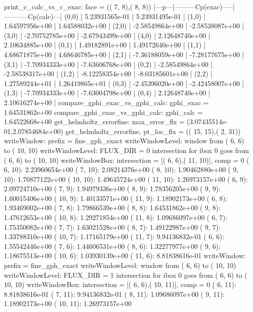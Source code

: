 \begin{itemize}
print_c_calc_vs_c_exac: face = ((  7,  8),(  8,  8))
|---p---|---------Cp(exac)-----|-----------Cp(calc)---|
(0,0)   |     5.23931565e-01   |     5.23931495e-01   |    
(1,0)   |     1.64597956e+00   |     1.64588032e+00   |    
(2,0)   |    -2.58549864e+00   |    -2.58538087e+00   |    
(3,0)   |    -2.70752785e+00   |    -2.67943499e+00   |    
(4,0)   |     2.12648740e+00   |     2.10634885e+00   |    
(0,1)   |     1.49182891e+00   |     1.49172640e+00   |    
(1,1)   |     4.68671875e+00   |     4.68646785e+00   |    
(2,1)   |    -7.36188059e+00   |    -7.28177675e+00   |    
(3,1)   |    -7.70934333e+00   |    -7.63606768e+00   |    
(0,2)   |    -2.58549864e+00   |    -2.58538317e+00   |    
(1,2)   |    -8.12258354e+00   |    -8.03185601e+00   |    
(2,2)   |     1.27589244e+01   |     1.26419865e+01   |    
(0,3)   |    -2.45396020e+00   |    -2.42458007e+00   |    
(1,3)   |    -7.70934333e+00   |    -7.63004798e+00   |    
(0,4)   |     2.12648740e+00   |     2.10616274e+00   |    
compare_gphi_exac_vs_gphi_calc: gphi_exac = 1.64531862e+00
compare_gphi_exac_vs_gphi_calc: gphi_calc = 1.64522668e+00
get_helmholtz_errorfine: max_error_flx = (3.07435514e-01,2.07854684e+00)
get_helmholtz_errorfine, pt_loc_flx    = (( 15, 15),(  2, 31))
writeWindow: prefix = fine_gph_exact     
writeWindowLevel:  window from (  6,  6) to ( 10, 10)
writeWindowLevel: FLUX_DIR = 0
 intersection for ibox  0 goes from (  6,  6) to ( 10, 10)
writeWindowBox: intersection = [(  6,  6),( 11, 10)], comp = 0
(  6, 10): 2.23960654e+00  (  7, 10): 2.08214376e+00  (  8, 10): 1.90462880e+00  (  9, 10): 1.70877122e+00  ( 10, 10): 1.49645724e+00  ( 11, 10): 1.26973157e+00  
(  6,  9): 2.09724710e+00  (  7,  9): 1.94979336e+00  (  8,  9): 1.78356205e+00  (  9,  9): 1.60015406e+00  ( 10,  9): 1.40133571e+00  ( 11,  9): 1.18902173e+00  
(  6,  8): 1.93469002e+00  (  7,  8): 1.79866539e+00  (  8,  8): 1.64531862e+00  (  9,  8): 1.47612653e+00  ( 10,  8): 1.29271854e+00  ( 11,  8): 1.09686097e+00  
(  6,  7): 1.75350082e+00  (  7,  7): 1.63021528e+00  (  8,  7): 1.49122987e+00  (  9,  7): 1.33788310e+00  ( 10,  7): 1.17165179e+00  ( 11,  7): 9.94136832e-01  
(  6,  6): 1.55542446e+00  (  7,  6): 1.44606531e+00  (  8,  6): 1.32277977e+00  (  9,  6): 1.18675513e+00  ( 10,  6): 1.03930139e+00  ( 11,  6): 8.81838616e-01  
writeWindow: prefix = fine_gph_exact     
writeWindowLevel:  window from (  6,  6) to ( 10, 10)
writeWindowLevel: FLUX_DIR = 1
 intersection for ibox  0 goes from (  6,  6) to ( 10, 10)
writeWindowBox: intersection = [(  6,  6),( 10, 11)], comp = 0
(  6, 11): 8.81838616e-01  (  7, 11): 9.94136832e-01  (  8, 11): 1.09686097e+00  (  9, 11): 1.18902173e+00  ( 10, 11): 1.26973157e+00  

\end{itemize}

